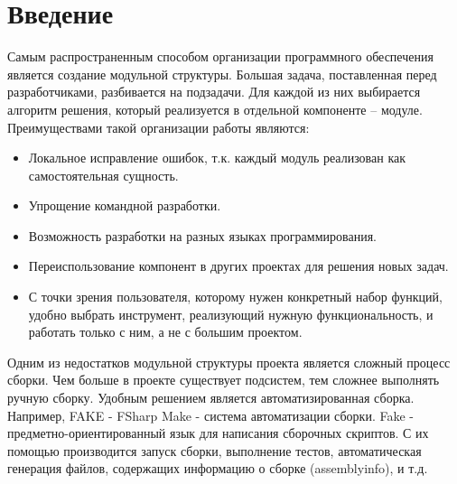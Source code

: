 \documentclass{matmex-diploma-custom}
\begin{document}

\maketitle
\tableofcontents
\section*{Введение}
Самым распространенным способом организации программного обеспечения является создание модульной структуры. Большая задача, поставленная перед разработчиками, разбивается на подзадачи. Для каждой из них выбирается алгоритм решения, который реализуется в отдельной компоненте – модуле. Преимуществами такой организации работы являются: 
\begin{itemize}
\item Локальное исправление ошибок, т.к. каждый модуль реализован как самостоятельная сущность.
\item Упрощение командной разработки.
\item Возможность разработки на разных языках программирования.
\item Переиспользование компонент в других проектах для решения новых задач.
\item С точки зрения пользователя, которому нужен конкретный набор функций, удобно выбрать инструмент, реализующий нужную функциональность, и работать только с ним, а не с большим проектом. 
\end{itemize}

Одним из недостатков модульной структуры проекта является сложный процесс сборки. Чем больше в проекте существует подсистем, тем сложнее выполнять ручную сборку. Удобным решением является автоматизированная сборка. Например, FAKE \cite{web:fake} - FSharp Make - система автоматизации сборки. Fake - предметно-ориентированный язык для написания сборочных скриптов. С их помощью производится запуск сборки, выполнение тестов, автоматическая генерация файлов, содержащих информацию о сборке (assemblyinfo), и т.д. 
\end{document}
